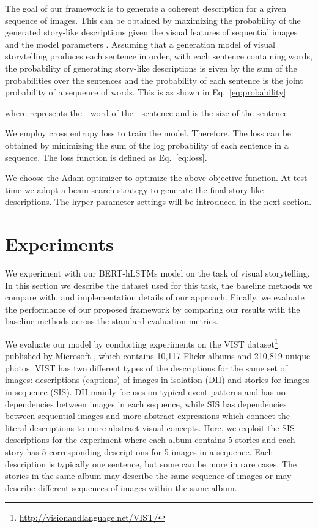 \documentclass[a4paper,fleqn]{cas-sc}
\begin{document}
The goal of our framework is to generate a coherent description for a given sequence of images. This can be obtained by maximizing the probability of the generated story-like descriptions  given the visual features  of sequential images and the model parameters . Assuming that a generation model of visual storytelling produces each sentence in order, with each sentence containing  words, the probability of generating story-like descriptions is given by the sum of the probabilities over the sentences and the probability of each sentence is the joint probability of a sequence of words. This is as shown in Eq.~\ref{eq:probability}
 


where  represents the - word of the - sentence and  is the size of the sentence.

We employ  cross entropy loss to train the model. Therefore, The loss can be obtained by minimizing the sum of the log probability of each sentence in a sequence. The loss function is defined as Eq.~\ref{eq:loss}.

 

We choose the Adam optimizer to optimize the above objective function. At test time we adopt a beam search strategy to generate the final story-like descriptions. The hyper-parameter settings  will be introduced in the next section.

\section{Experiments}

We experiment with our BERT-hLSTMs model on the task of visual storytelling. In this section we describe the dataset used for this task, the baseline methods we compare with, and implementation details of our approach. Finally, we evaluate the performance of our proposed framework by comparing our results with the baseline methods across the standard evaluation metrics.

 We evaluate our model by conducting experiments on the VIST dataset\footnote{\url{http://visionandlanguage.net/VIST/}} published by Microsoft \citep{Huang2016}, which contains 10,117 Flickr albums and 210,819 unique photos. VIST has two different types of the descriptions for the same set of images: descriptions (captions) of images-in-isolation (DII) and stories for images-in-sequence (SIS). DII mainly focuses on typical event patterns and has no dependencies between images in each sequence, while SIS has dependencies between sequential images and more abstract expressions which connect the literal descriptions to more abstract visual concepts. Here, we exploit the SIS descriptions for the experiment where each album contains 5 stories and each story has 5 corresponding  descriptions  for 5 images in a sequence. Each description is typically one sentence, but some can be more in rare cases. The stories in the same album may describe the same sequence of images or may describe  different sequences of images within the same album.
\end{document}
